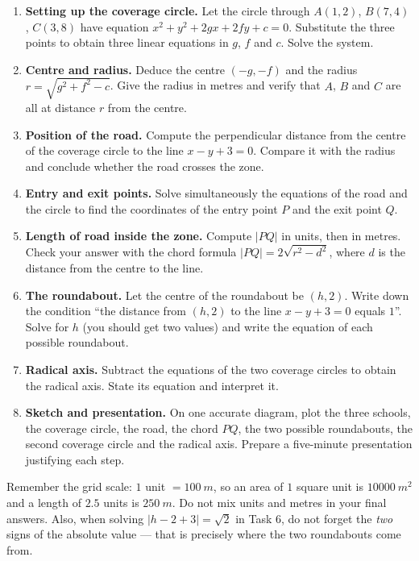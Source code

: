 \documentclass[11pt]{article}
\newcounter{popsec}
\newcounter{popsub}
\newcommand{\courssub}[1]{%
  \stepcounter{popsub}%
  \par\vspace{9pt}\noindent{\popxbold\fontsize{11.5}{13}\selectfont\color{popink}{\color{poporange}\thepopsec.\thepopsub}\hspace{6pt}#1}\par\nopagebreak\vspace{4pt}
}
\begin{document}
\courssub{Tasks}

\begin{enumerate}
\item \textbf{Setting up the coverage circle.} Let the circle through $A(1,2)$, $B(7,4)$, $C(3,8)$ have equation $x^{2}+y^{2}+2gx+2fy+c=0$. Substitute the three points to obtain three linear equations in $g$, $f$ and $c$. Solve the system.
\item \textbf{Centre and radius.} Deduce the centre $(-g,-f)$ and the radius $r=\sqrt{g^{2}+f^{2}-c}$. Give the radius in metres and verify that $A$, $B$ and $C$ are all at distance $r$ from the centre.
\item \textbf{Position of the road.} Compute the perpendicular distance from the centre of the coverage circle to the line $x-y+3=0$. Compare it with the radius and conclude whether the road crosses the zone.
\item \textbf{Entry and exit points.} Solve simultaneously the equations of the road and the circle to find the coordinates of the entry point $P$ and the exit point $Q$.
\item \textbf{Length of road inside the zone.} Compute $|PQ|$ in units, then in metres. Check your answer with the chord formula $|PQ|=2\sqrt{r^{2}-d^{2}}$, where $d$ is the distance from the centre to the line.
\item \textbf{The roundabout.} Let the centre of the roundabout be $(h,2)$. Write down the condition ``the distance from $(h,2)$ to the line $x-y+3=0$ equals $1$''. Solve for $h$ (you should get two values) and write the equation of each possible roundabout.
\item \textbf{Radical axis.} Subtract the equations of the two coverage circles to obtain the radical axis. State its equation and interpret it.
\item \textbf{Sketch and presentation.} On one accurate diagram, plot the three schools, the coverage circle, the road, the chord $PQ$, the two possible roundabouts, the second coverage circle and the radical axis. Prepare a five-minute presentation justifying each step.
\end{enumerate}

\begin{attention}
Remember the grid scale: $1$ unit $=\SI{100}{m}$, so an area of $1$ square unit is $\SI{10000}{m^{2}}$ and a length of $2.5$ units is $\SI{250}{m}$. Do not mix units and metres in your final answers. Also, when solving $|h-2+3|=\sqrt{2}$ in Task 6, do not forget the \emph{two} signs of the absolute value --- that is precisely where the two roundabouts come from.
\end{attention}
\end{document}
